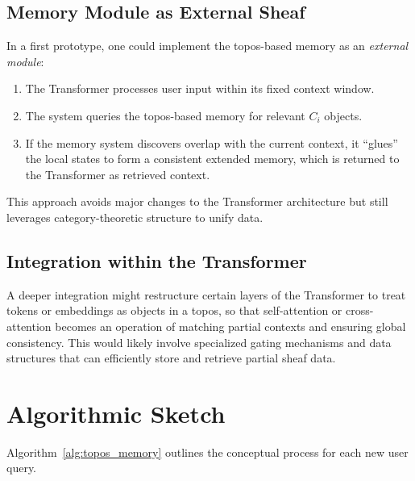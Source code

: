\documentclass{article}
\begin{document}
\subsection{Memory Module as External Sheaf}
\label{subsec:external_sheaf_module}

In a first prototype, one could implement the topos-based memory as an \emph{external module}:
\begin{enumerate}
    \item The Transformer processes user input within its fixed context window.
    \item The system queries the topos-based memory for relevant $C_i$ objects.
    \item If the memory system discovers overlap with the current context, it “glues” the local states to form a consistent extended memory, which is returned to the Transformer as retrieved context.
\end{enumerate}
This approach avoids major changes to the Transformer architecture but still leverages category-theoretic structure to unify data.

\subsection{Integration within the Transformer}
\label{subsec:internal_integration}

A deeper integration might restructure certain layers of the Transformer to treat tokens or embeddings as objects in a topos, so that self-attention or cross-attention becomes an operation of matching partial contexts and ensuring global consistency. This would likely involve specialized gating mechanisms and data structures that can efficiently store and retrieve partial sheaf data.

\section{Algorithmic Sketch}
\label{sec:algo_sketch}

Algorithm~\ref{alg:topos_memory} outlines the conceptual process for each new user query.
\end{document}
